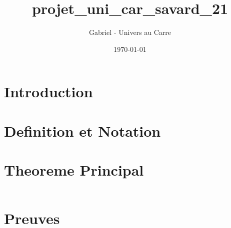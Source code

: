 \documentclass[12pt]{article}
\title{projet_uni_car_savard_21}
\author{Gabriel - Univers au Carre}
\date{\today}
\begin{document}
\maketitle


\section{Introduction}



\section{Definition et Notation}



\section{Theoreme Principal}


\begin{equation}
\end{equation}


\section{Preuves}


\end{document}

